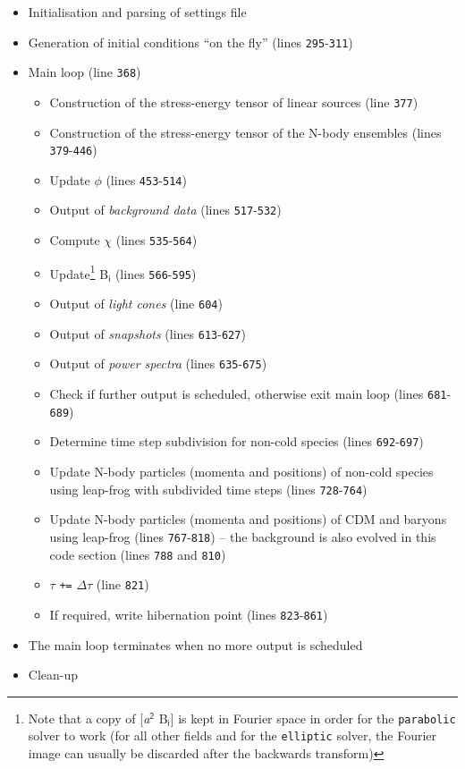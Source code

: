 \documentclass[a4paper,10pt]{article}
\begin{document}
\begin{itemize}
 \item Initialisation and parsing of settings file
 \item Generation of initial conditions ``on the fly'' (lines \texttt{295}-\texttt{311})
 \item Main loop (line \texttt{368})
\begin{itemize}
 \item Construction of the stress-energy tensor of linear sources (line \texttt{377})
 \item Construction of the stress-energy tensor of the N-body ensembles (lines \texttt{379}-\texttt{446})
 \item Update $\mathsf{\phi}$ (lines \texttt{453}-\texttt{514})
 \item Output of \textit{background data} (lines \texttt{517}-\texttt{532})
 \item Compute $\mathsf{\chi}$ (lines \texttt{535}-\texttt{564})
 \item Update\footnote{Note that a copy of [\textit{a}$^\mathsf{2}$ B$_\mathsf{i}$] is kept in Fourier space in order for the \texttt{parabolic} solver to work (for all other fields and for the \texttt{elliptic} solver, the Fourier image can usually be discarded after the backwards transform)} B$_\mathsf{i}$ (lines \texttt{566}-\texttt{595})
 \item Output of \textit{light cones} (line \texttt{604})
 \item Output of \textit{snapshots} (lines \texttt{613}-\texttt{627})
 \item Output of \textit{power spectra} (lines \texttt{635}-\texttt{675})
 \item Check if further output is scheduled, otherwise exit main loop (lines \texttt{681}-\texttt{689})
 \item Determine time step subdivision for non-cold species (lines \texttt{692}-\texttt{697})
 \item Update N-body particles (momenta and positions) of non-cold species using leap-frog with subdivided time steps (lines \texttt{728}-\texttt{764})
 \item Update N-body particles (momenta and positions) of CDM and baryons using leap-frog (lines \texttt{767}-\texttt{818}) -- the background is also evolved in this code section (lines \texttt{788} and \texttt{810})
 \item $\mathsf{\tau}$ \texttt{+=} $\mathsf{\Delta\tau}$ (line \texttt{821})
 \item If required, write hibernation point (lines \texttt{823}-\texttt{861})
\end{itemize}
\item The main loop terminates when no more output is scheduled
 \item Clean-up
\end{itemize}
\end{document}
